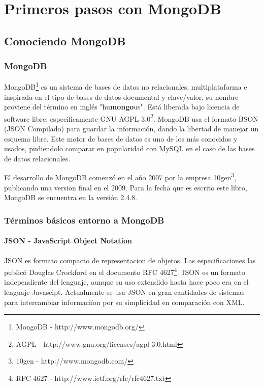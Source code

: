 \part{Primeros pasos con MongoDB} 
\chapter{Conociendo MongoDB}

\section{MongoDB}

MongoDB\footnote{MongoDB - http://www.mongodb.org/} es un sistema de bases de datos no relacionales, multiplataforma e inspirada en el tipo de bases de datos documental y clave/valor, su nombre proviene del t\'ermino en ingl\'es "hu\textbf{mongo}us". Est\'a liberada bajo licencia de software libre, espec\'ificamente GNU AGPL 3.0\footnote{AGPL - http://www.gnu.org/licenses/agpl-3.0.html}. MongoDB usa el formato BSON (JSON Compilado) para guardar la informaci\'on, dando la libertad de manejar un esquema libre. Este motor de bases de datos es uno de los m\'as conocidos y usados, pudiendolo comparar en popularidad con MySQL en el caso de las bases de datos relacionales.

El desarrollo de MongoDB comenz\'o en el a\~no 2007 por la empresa 10gen\footnote{10gen - http://www.mongodb.com/}, publicando una version final en el 2009. Para la fecha que es escrito este libro, MongoDB se encuentra en la versi\'on 2.4.8.

\section{T\'erminos b\'asicos entorno a MongoDB}

\subsection{JSON - JavaScript Object Notation}

JSON es formato compacto de representacion de objetos. Las especificaciones las public\'o Douglas Crockford en el documento RFC 4627\footnote{RFC 4627 - http://www.ietf.org/rfc/rfc4627.txt}. JSON es un formato independiente del lenguaje, aunque su uso extendido hasta hace poco era en el lenguaje Javascipt. Actualmente se usa JSON en gran cantidades de sistemas para intercambiar informaci\'ion por su simplicidad en comparaci\'on con XML.

